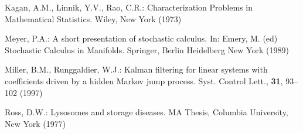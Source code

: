 %
%
%

%
% 
% 
%
\begin{thebibliography}{[KLR73]}
%
%
%
 Kagan, A.M., Linnik, Y.V., Rao, C.R.:
Characterization Problems in Mathematical Statistics. Wiley, New York (1973)

 Meyer, P.A.: A short presentation of
stochastic calculus. In: Emery, M. (ed) Stochastic Calculus in
Manifolds. Springer, Berlin Heidelberg New York (1989)

 Miller, B.M., Runggaldier, W.J.: Kalman
filtering for linear systems with coefficients driven by a hidden Markov
jump process. Syst. Control Lett., \textbf{31}, 93--102 (1997)

 Ross, D.W.: Lysosomes and storage diseases. MA
Thesis, Columbia University, New York (1977)

\end{thebibliography}

